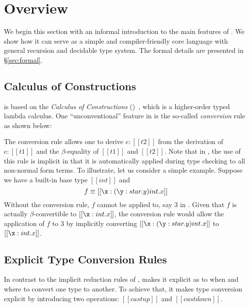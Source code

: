 \section{Overview}


We begin this section with an informal introduction to the main features of \name. We show how it can serve as a simple and compiler-friendly core language with general recursion and decidable type system. The formal details are presented in \S\ref{sec:formal}.

\subsection{Calculus of Constructions}
\label{sec:coc}

\name is based on the \emph{Calculus of Constructions} (\coc)~\cite{coc}, which is a higher-order typed lambda calculus. One ``unconventional'' feature in \coc is the so-called \emph{conversion} rule as shown below:
\renewcommand{\ottpremise}[1]{\enskip #1 \enskip}
\ottusedrule{\ottdruleTccXXConv{}}

The conversion rule allows one to derive $e:[[t2]]$ from the derivation of $e:[[t1]]$ and the $\beta$-equality of $[[t1]]$ and $[[t2]]$. Note that in \coc, the use of this rule is implicit in that it is automatically applied during type checking to all non-normal form terms. To illustrate, let us consider a simple example. Suppose we have a built-in base type $[[int]]$ and \[f \equiv [[\x:(\y:star.y)int.x]] \] Without the conversion rule, $f$ cannot be applied to, say $3$ in \coc. Given that $f$ is actually $\beta$-convertible to $[[\x:int.x]]$, the conversion rule would allow the application of $f$ to $3$ by implicitly converting $[[\x:(\y:star.y)int.x]]$ to $[[\x:int.x]]$.

\subsection{Explicit Type Conversion Rules}


In contrast to the implicit reduction rules of \coc, \name makes it explicit as to when and where to convert one type to another. To achieve that, it makes type conversion explicit by introducing two operations: $[[castup]]$ and $[[castdown]]$.

